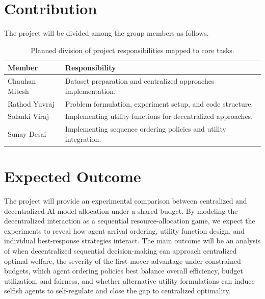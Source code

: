 \documentclass{article}
\begin{document}
\section{Contribution} 

The project will be divided among the group members as follows. 

\begin{table}[h] 
\centering 
\begin{tabular}{l p{10cm}} 
\toprule 
\textbf{Member} & \textbf{Responsibility} \\ 
\midrule 
Chauhan Mitesh & Dataset preparation and centralized approaches implementation. \\ 
Rathod Yuvraj  & Problem formulation, experiment setup, and code structure. \\ 
Solanki Viraj  & Implementing utility functions for decentralized approaches. \\ 
Sunay Desai    & Implementing sequence ordering policies and utility integration. \\ 
\bottomrule 
\end{tabular} 
\vspace{0.5cm}
\caption{Planned division of project responsibilities mapped to core tasks.} 
\label{tab:responsibilities}
\end{table}

\section{Expected Outcome} 

The project will provide an experimental comparison between centralized and decentralized AI-model allocation under a shared budget. By modeling the decentralized interaction as a sequential resource-allocation game, we expect the experiments to reveal how agent arrival ordering, utility function design, and individual best-response strategies interact. The main outcome will be an analysis of when decentralized sequential decision-making can approach centralized optimal welfare, the severity of the first-mover advantage under constrained budgets, which agent ordering policies best balance overall efficiency, budget utilization, and fairness, and whether alternative utility formulations can induce selfish agents to self-regulate and close the gap to centralized optimality. 


 
 
\end{document}
